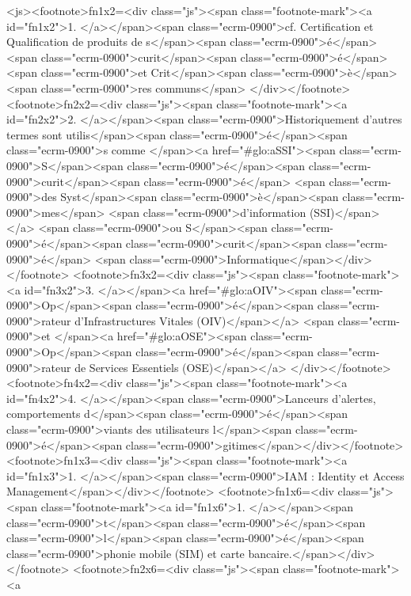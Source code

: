 \def\jstoday{2023-01-26 18:01:00}    <js><footnote>fn1x2=<div class="js"><span class="footnote-mark"><a 
 id="fn1x2">1. </a></span><span 
class="ecrm-0900">cf. Certification et Qualification de produits de s</span><span 
class="ecrm-0900">é</span><span 
class="ecrm-0900">curit</span><span 
class="ecrm-0900">é</span> <span 
class="ecrm-0900">et Crit</span><span 
class="ecrm-0900">è</span><span 
class="ecrm-0900">res communs</span>
       </div></footnote> 
<footnote>fn2x2=<div class="js"><span class="footnote-mark"><a 
 id="fn2x2">2. </a></span><span 
class="ecrm-0900">Historiquement d’autres termes sont utilis</span><span 
class="ecrm-0900">é</span><span 
class="ecrm-0900">s comme </span><a 
href="#glo:aSSI"><span 
class="ecrm-0900">S</span><span 
class="ecrm-0900">é</span><span 
class="ecrm-0900">curit</span><span 
class="ecrm-0900">é</span> <span 
class="ecrm-0900">des Syst</span><span 
class="ecrm-0900">è</span><span 
class="ecrm-0900">mes</span>
  <span 
class="ecrm-0900">d’information (SSI)</span></a> <span 
class="ecrm-0900">ou S</span><span 
class="ecrm-0900">é</span><span 
class="ecrm-0900">curit</span><span 
class="ecrm-0900">é</span> <span 
class="ecrm-0900">Informatique</span></div></footnote> 
<footnote>fn3x2=<div class="js"><span class="footnote-mark"><a 
 id="fn3x2">3. </a></span><a 
href="#glo:aOIV"><span 
class="ecrm-0900">Op</span><span 
class="ecrm-0900">é</span><span 
class="ecrm-0900">rateur d’Infrastructures Vitales (OIV)</span></a> <span 
class="ecrm-0900">et </span><a 
href="#glo:aOSE"><span 
class="ecrm-0900">Op</span><span 
class="ecrm-0900">é</span><span 
class="ecrm-0900">rateur de Services Essentiels (OSE)</span></a>
  </div></footnote> 
<footnote>fn4x2=<div class="js"><span class="footnote-mark"><a 
 id="fn4x2">4. </a></span><span 
class="ecrm-0900">Lanceurs d’alertes, comportements d</span><span 
class="ecrm-0900">é</span><span 
class="ecrm-0900">viants des utilisateurs l</span><span 
class="ecrm-0900">é</span><span 
class="ecrm-0900">gitimes</span></div></footnote> 
<footnote>fn1x3=<div class="js"><span class="footnote-mark"><a 
 id="fn1x3">1. </a></span><span 
class="ecrm-0900">IAM : Identity et Access Management</span></div></footnote> 
<footnote>fn1x6=<div class="js"><span class="footnote-mark"><a 
 id="fn1x6">1. </a></span><span 
class="ecrm-0900">t</span><span 
class="ecrm-0900">é</span><span 
class="ecrm-0900">l</span><span 
class="ecrm-0900">é</span><span 
class="ecrm-0900">phonie mobile (SIM) et carte bancaire.</span></div></footnote> 
<footnote>fn2x6=<div class="js"><span class="footnote-mark"><a 
